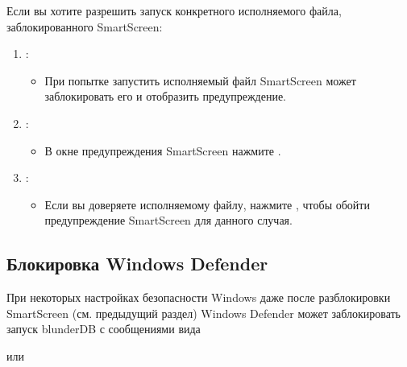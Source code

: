 \documentclass[letterpaper,10pt,russian]{sphinxmanual}
\begin{document}
\sphinxAtStartPar
Если вы хотите разрешить запуск конкретного исполняемого файла, заблокированного SmartScreen:
\begin{enumerate}
%
\item {} 
\sphinxAtStartPar
{}:
\begin{itemize}
\item {} 
\sphinxAtStartPar
При попытке запустить исполняемый файл SmartScreen может заблокировать его и отобразить предупреждение.

\end{itemize}

\item {} 
\sphinxAtStartPar
{}:
\begin{itemize}
\item {} 
\sphinxAtStartPar
В окне предупреждения SmartScreen нажмите .

\end{itemize}

\item {} 
\sphinxAtStartPar
{}:
\begin{itemize}
\item {} 
\sphinxAtStartPar
Если вы доверяете исполняемому файлу, нажмите , чтобы обойти предупреждение SmartScreen для данного случая.

\end{itemize}

\end{enumerate}


\subsection{Блокировка Windows Defender}
\label{\detokenize{annexe_windows_securite:blocage-windows-defender}}
\sphinxAtStartPar
При некоторых настройках безопасности Windows даже после разблокировки SmartScreen (см. предыдущий раздел) Windows Defender может заблокировать запуск blunderDB с сообщениями вида

\begin{figure}[htbp]
\centering

\noindent{}
\end{figure}

\sphinxAtStartPar
или
\end{document}
